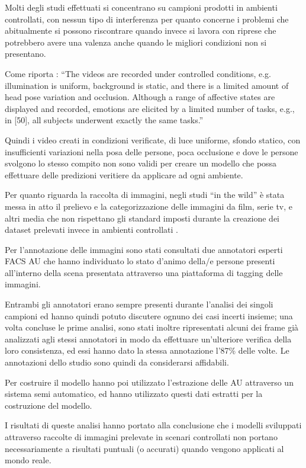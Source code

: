 Molti degli studi effettuati si concentrano su campioni prodotti in ambienti controllati, con nessun tipo di interferenza per quanto concerne i problemi che abitualmente si possono riscontrare quando invece si lavora con riprese che potrebbero avere una valenza anche quando le migliori condizioni non si presentano.

Come riporta \cite{AFEWVAdatabaseInTheWild}: “The videos are recorded under controlled conditions, e.g. illumination is uniform, background is static, and there is a limited amount of head pose variation and occlusion. Although a range of affective states are displayed and recorded, emotions are elicited by a limited number of tasks, e.g., in [50], all subjects underwent exactly the same tasks.”

Quindi i video creati in condizioni verificate, di luce uniforme, sfondo statico, con insufficienti variazioni nella posa delle persone, poca occlusione e dove le persone svolgono lo stesso compito non sono validi per creare un modello che possa effettuare delle predizioni veritiere da applicare ad ogni ambiente.

Per quanto riguarda la raccolta di immagini, negli studi “in the wild” è stata messa in atto il prelievo e la categorizzazione delle immagini da film, serie tv, e altri media che non rispettano gli standard imposti durante la creazione dei dataset prelevati invece in ambienti controllati \cite{AFEWVAdatabaseInTheWild}.

Per l’annotazione delle immagini sono stati consultati due annotatori esperti FACS AU che hanno individuato lo stato d’animo della/e persone presenti all’interno della scena presentata attraverso una piattaforma di tagging delle immagini.

Entrambi gli annotatori erano sempre presenti durante l’analisi dei singoli campioni ed hanno quindi potuto discutere ognuno dei casi incerti insieme; una volta concluse le prime analisi, sono stati inoltre ripresentati alcuni dei frame già analizzati agli stessi annotatori in modo da effettuare un’ulteriore verifica della loro consistenza, ed essi hanno dato la stessa annotazione l’87\% delle volte. Le annotazioni dello studio sono quindi da considerarsi affidabili.

Per costruire il modello hanno poi utilizzato l’estrazione delle AU attraverso un sistema semi automatico, ed hanno utilizzato questi dati estratti per la costruzione del modello.

I risultati di queste analisi hanno portato alla conclusione che i modelli sviluppati attraverso raccolte di immagini prelevate in scenari controllati non portano necessariamente a risultati puntuali (o accurati) quando vengono applicati al mondo reale.

